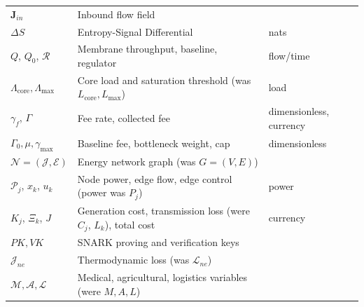 \documentclass[11pt,a4paper]{article}
\theoremstyle{definition}
\theoremstyle{plain}
\theoremstyle{remark}
\begin{document}
\begin{longtable}{@{}p{2.8cm}p{9.2cm}p{3.2cm}@{}}
$\mathbf J_{in}$ & Inbound flow field & \\
$\Delta S$ & Entropy-Signal Differential & nats \\
$Q$, $Q_0$, $\mathcal R$ & Membrane throughput, baseline, regulator & flow/time \\
$\Lambda_{\mathrm{core}}, \Lambda_{\max}$ & Core load and saturation threshold (was $L_{\mathrm{core}}, L_{\max}$) & load \\
$\gamma_f$, $\Gamma$ & Fee rate, collected fee & dimensionless, currency \\
$\Gamma_0, \mu, \gamma_{\max}$ & Baseline fee, bottleneck weight, cap & dimensionless \\
$\mathcal N=(\mathcal J,\mathcal E)$ & Energy network graph (was $G=(V,E)$) & \\
$\mathcal P_j$, $x_k$, $u_k$ & Node power, edge flow, edge control (power was $P_j$) & power \\
$K_j$, $\Xi_k$, $J$ & Generation cost, transmission loss (were $C_j$, $L_k$), total cost & currency \\
$PK, VK$ & SNARK proving and verification keys & \\
$\mathcal J_{ne}$ & Thermodynamic loss (was $\mathcal L_{ne}$) & \\
$\mathcal M, \mathcal A, \mathcal L$ & Medical, agricultural, logistics variables (were $M, A, L$) & \\
\bottomrule
\end{longtable}

\clearpage
\clearpage
\end{document}
